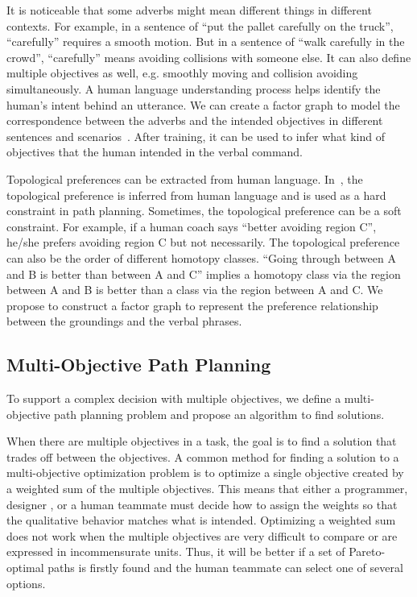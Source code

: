 \documentclass[phd]{byuprop}
\begin{document}
It is noticeable that some adverbs might mean different things in different contexts.
For example, in a sentence of ``put the pallet carefully on the truck'', ``carefully'' requires a smooth motion. 
But in a sentence of ``walk carefully in the crowd'', ``carefully'' means avoiding collisions with someone else.
It can also define multiple objectives as well, e.g. smoothly moving and collision avoiding simultaneously.
A human language understanding process helps identify the human's intent behind an utterance.
We can create a factor graph to model the correspondence between the adverbs and the intended objectives in different sentences and scenarios~\cite{tellex2011understanding}.
After training, it can be used to infer what kind of objectives that the human intended in the verbal command.

Topological preferences can be extracted from human language.
In~\cite{howard2014natural}, the topological preference is inferred from human language and is used as a hard constraint in path planning.
Sometimes, the topological preference can be a soft constraint.
For example, if a human coach says ``better avoiding region C'', he/she prefers avoiding region C but not necessarily.
The topological preference can also be the order of different homotopy classes.
``Going through between A and B is better than between A and C'' implies a homotopy class via the region between A and B is better than a class via the region between A and C.
We propose to construct a factor graph to represent the preference relationship between the groundings and the verbal phrases.

\subsection{Multi-Objective Path Planning}
\label{sec:project_description:multi_objective_path_planning}

To support a complex decision with multiple objectives, we define a multi-objective path planning problem and propose an algorithm to find solutions.

When there are multiple objectives in a task, the goal is to find a solution that trades off between the objectives.
A common method for finding a solution to a multi-objective optimization problem is to optimize a single objective created by a weighted sum of the multiple objectives.
This means that either a programmer, designer , or a human teammate must decide how to assign the weights so that the qualitative behavior matches what is intended. 
Optimizing a weighted sum does not work when the multiple objectives are very difficult to compare or are expressed in incommensurate units.
Thus, it will be better if a set of Pareto-optimal paths is firstly found and the human teammate can select one of several options.
\end{document}
